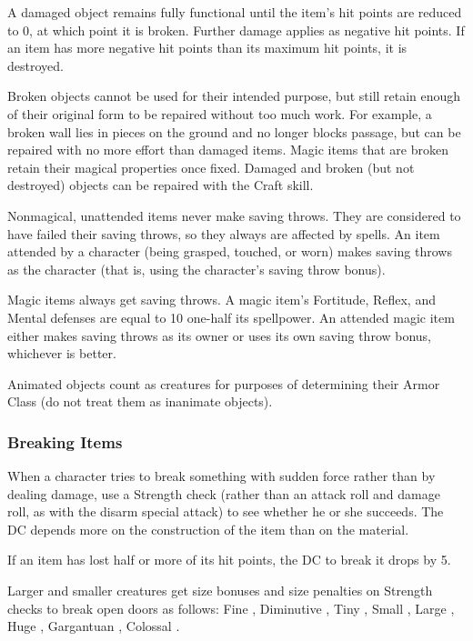  A damaged object remains fully functional until the item's hit points are reduced to 0, at which point it is broken. Further damage applies as negative hit points. If an item has more negative hit points than its maximum hit points, it is destroyed.

Broken objects cannot be used for their intended purpose, but still retain enough of their original form to be repaired without too much work. For example, a broken wall lies in pieces on the ground and no longer blocks passage, but can be repaired with no more effort than damaged items. Magic items that are broken retain their magical properties once fixed. Damaged and broken (but not destroyed) objects can be repaired with the Craft skill.

 Nonmagical, unattended items never make saving throws. They are considered to have failed their saving throws, so they always are affected by spells. An item attended by a character (being grasped, touched, or worn) makes saving throws as the character (that is, using the character's saving throw bonus).

\par Magic items always get saving throws. A magic item's Fortitude, Reflex, and Mental defenses are equal to 10 \add one-half its spellpower. An attended magic item either makes saving throws as its owner or uses its own saving throw bonus, whichever is better.

 Animated objects count as creatures for purposes of determining their Armor Class (do not treat them as inanimate objects).

\subsubsection{Breaking Items}
When a character tries to break something with sudden force rather than by dealing damage, use a Strength check (rather than an attack roll and damage roll, as with the disarm special attack) to see whether he or she succeeds. The DC depends more on the
construction of the item than on the material.

If an item has lost half or more of its hit points, the DC to break it drops by 5.

Larger and smaller creatures get size bonuses and size penalties on Strength checks to break open doors as follows: Fine , Diminutive , Tiny , Small , Large , Huge , Gargantuan , Colossal .

